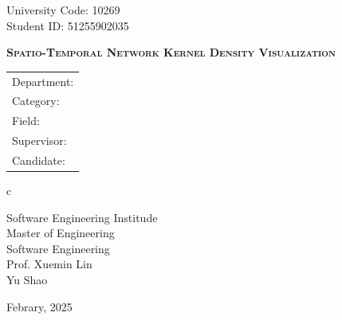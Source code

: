 \newpage

\pagestyle{empty}

\newline
\hspace*{\fill} {University Code: 10269}\\
\hspace*{\fill} {Student ID: 
51255902035
}%

\vskip 2cm

\begin{center}
    \vspace{1cm}
    {}
\end{center}

\vskip 3cm

\begin{center}
    \bfseries{\scshape{\huge Spatio-Temporal Network Kernel Density Visualization}}\\
\end{center}

\vskip 2cm {\large
        \begin{center}
            \begin{tabular}{l}
                Department:         \\
                Category:              \\
                Field: \\
                Supervisor:         \\
                Candidate:
            \end{tabular}
            \begin{tabular}c

                Software Engineering Institude \\
                \hline Master of Engineering\\
                \hline Software Engineering \\
                \hline Prof. Xuemin Lin \\
                \hline Yu Shao\\


                \hline
            \end{tabular}
        \end{center}}

\vskip 30mm

\begin{center}
    {\Large Febrary, 2025}
\end{center}

\cleardoublepage